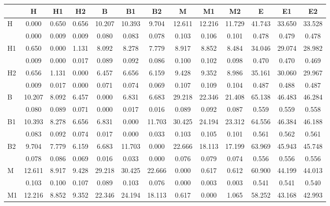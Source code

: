 \begin{table*}[h!]
\begin{center}
\begin{tabular}{| l | c | c | c | c | c | c | c | c | c | c | c | c |}\hline
 & H & H1 & H2 & B & B1 & B2 & M & M1 & M2 & E & E1 & E2 \\\hline
H & 0.000  & 0.650  & 0.656  & 10.207  & 10.393  & 9.704  & 12.611  & 12.216  & 11.729  & 41.743  & 33.650  & 33.528 \\\hline
 & 0.000  & 0.009  & 0.009  & 0.080  & 0.083  & 0.078  & 0.103  & 0.106  & 0.101  & 0.478  & 0.479  & 0.478 \\\hline
H1 & 0.650  & 0.000  & 1.131  & 8.092  & 8.278  & 7.779  & 8.917  & 8.852  & 8.484  & 34.046  & 29.074  & 28.982 \\\hline
 & 0.009  & 0.000  & 0.017  & 0.089  & 0.092  & 0.086  & 0.100  & 0.102  & 0.098  & 0.470  & 0.470  & 0.469 \\\hline
H2 & 0.656  & 1.131  & 0.000  & 6.457  & 6.656  & 6.159  & 9.428  & 9.352  & 8.986  & 35.161  & 30.060  & 29.967 \\\hline
 & 0.009  & 0.017  & 0.000  & 0.071  & 0.074  & 0.069  & 0.107  & 0.109  & 0.104  & 0.487  & 0.488  & 0.487 \\\hline
B & 10.207  & 8.092  & 6.457  & 0.000  & 6.831  & 6.683  & 29.218  & 22.346  & 21.408  & 65.138  & 46.483  & 46.284 \\\hline
 & 0.080  & 0.089  & 0.071  & 0.000  & 0.017  & 0.016  & 0.089  & 0.092  & 0.087  & 0.559  & 0.559  & 0.558 \\\hline
B1 & 10.393  & 8.278  & 6.656  & 6.831  & 0.000  & 11.703  & 30.425  & 24.194  & 23.312  & 64.556  & 46.384  & 46.188 \\\hline
 & 0.083  & 0.092  & 0.074  & 0.017  & 0.000  & 0.033  & 0.103  & 0.105  & 0.101  & 0.561  & 0.562  & 0.561 \\\hline
B2 & 9.704  & 7.779  & 6.159  & 6.683  & 11.703  & 0.000  & 22.666  & 18.113  & 17.199  & 63.969  & 45.943  & 45.748 \\\hline
 & 0.078  & 0.086  & 0.069  & 0.016  & 0.033  & 0.000  & 0.076  & 0.079  & 0.074  & 0.556  & 0.556  & 0.556 \\\hline
M & 12.611  & 8.917  & 9.428  & 29.218  & 30.425  & 22.666  & 0.000  & 0.617  & 0.612  & 60.900  & 44.199  & 44.013 \\\hline
 & 0.103  & 0.100  & 0.107  & 0.089  & 0.103  & 0.076  & 0.000  & 0.003  & 0.003  & 0.541  & 0.541  & 0.540 \\\hline
M1 & 12.216  & 8.852  & 9.352  & 22.346  & 24.194  & 18.113  & 0.617  & 0.000  & 1.065  & 58.252  & 43.168  & 42.993 \\\hline

\end{tabular}
\end{center}
\end{table*}
